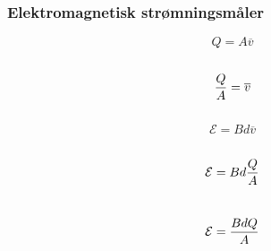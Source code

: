 \documentclass[aspectratio=169,xcolor=dvipsnames]{beamer}
\begin{document}
%
%
%
\begin{frame}
	\frametitle{Elektromagnetisk strømningsmåler}
$$Q = A\overline{v}$$
\\
$${Q \over A} = \overline{v}$$
\\
$$\mathcal{E} = Bd\overline{v}$$
\\
$$\mathcal{E} = Bd {Q \over A}$$
\\
$$\mathcal{E} = {BdQ \over A}$$

\end{frame}
\end{document}
